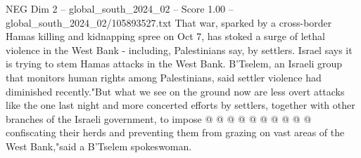 \begin{textsample}{NEG Dim 2 – global\_south\_2024\_02 – Score 1.00 – global\_south\_2024\_02/105893527.txt}
That war, sparked by a cross-border Hamas killing and kidnapping spree on Oct 7, has stoked a surge of lethal violence in the West Bank - including, Palestinians say, by settlers.
Israel says it is trying to stem Hamas attacks in the West Bank.
B'Tselem, an Israeli group that monitors human rights among Palestinians, said settler violence had diminished recently."But what we see on the ground now are less overt attacks like the one last night and more concerted efforts by settlers, together with other branches of the Israeli government, to impose @ @ @ @ @ @ @ @ @ @ confiscating their herds and preventing them from grazing on vast areas of the West Bank,"said a B'Tselem spokeswoman.

\end{textsample}

